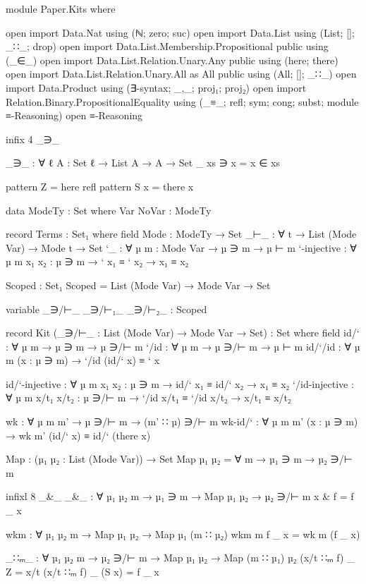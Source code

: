 \begin{code}
module Paper.Kits where

open import Data.Nat using (ℕ; zero; suc)
open import Data.List using (List; []; _∷_; drop)
open import Data.List.Membership.Propositional public using (_∈_)
open import Data.List.Relation.Unary.Any public using (here; there)
open import Data.List.Relation.Unary.All as All public using (All; []; _∷_)
open import Data.Product using (∃-syntax; _,_; proj₁; proj₂)
open import Relation.Binary.PropositionalEquality using (_≡_; refl; sym; cong; subst; module ≡-Reasoning)
open ≡-Reasoning

infix  4  _∋_

_∋_ : ∀ {ℓ} {A : Set ℓ} → List A → A → Set _
xs ∋ x = x ∈ xs

pattern Z = here refl
pattern S x = there x

data ModeTy : Set where
  Var NoVar : ModeTy

record Terms : Set₁ where
  field
    Mode        : ModeTy → Set
    _⊢_         : ∀ {t} → List (Mode Var) → Mode t → Set
    `_          : ∀ {µ} {m : Mode Var} → µ ∋ m → µ ⊢ m
    `-injective : ∀ {µ m} {x₁ x₂ : µ ∋ m} → ` x₁ ≡ ` x₂ → x₁ ≡ x₂

  Scoped : Set₁
  Scoped = List (Mode Var) → Mode Var → Set

  variable _∋/⊢_ _∋/⊢₁_  _∋/⊢₂_ : Scoped

  record Kit (_∋/⊢_ : List (Mode Var) → Mode Var → Set) : Set where
    field
      id/`            : ∀ {µ m} → µ ∋ m → µ ∋/⊢ m
      `/id            : ∀ {µ m} → µ ∋/⊢ m → µ ⊢ m
      id/`/id         : ∀ {µ m} (x : µ ∋ m) → `/id (id/` x) ≡ ` x

      id/`-injective  : ∀ {µ m} {x₁ x₂ : µ ∋ m} → id/` x₁ ≡ id/` x₂ → x₁ ≡ x₂
      `/id-injective  : ∀ {µ m} {x/t₁ x/t₂ : µ ∋/⊢ m} → `/id x/t₁ ≡ `/id x/t₂ → x/t₁ ≡ x/t₂

      wk              : ∀ {µ m} m' → µ ∋/⊢ m → (m' ∷ µ) ∋/⊢ m
      wk-id/`         : ∀ {µ m} m' (x : µ ∋ m) → wk m' (id/` x) ≡ id/` (there x)

    Map : (µ₁ µ₂ : List (Mode Var)) → Set
    Map µ₁ µ₂ = ∀ m → µ₁ ∋ m → µ₂ ∋/⊢ m

    infixl  8  _&_
    _&_ : ∀ {µ₁ µ₂ m} → µ₁ ∋ m → Map µ₁ µ₂ → µ₂ ∋/⊢ m
    x & f = f _ x 

    wkm : ∀ {µ₁ µ₂} m → Map µ₁ µ₂ → Map µ₁ (m ∷ µ₂)
    wkm m f _ x = wk m (f _ x)

    _∷ₘ_ :
      ∀ {µ₁ µ₂ m} → µ₂ ∋/⊢ m → Map µ₁ µ₂ → Map (m ∷ µ₁) µ₂
    (x/t ∷ₘ f) _ Z     = x/t
    (x/t ∷ₘ f) _ (S x) = f _ x


\end{code}
